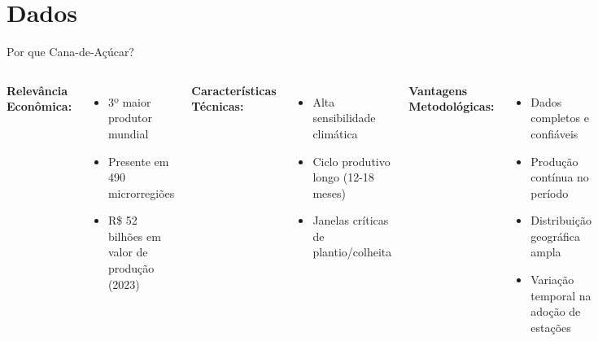 \documentclass[10pt,aspectratio=169]{beamer}
\begin{document}
\section{Dados}

\begin{frame}{Por que Cana-de-Açúcar?}
\begin{columns}
\textbf{Relevância Econômica:}
\begin{itemize}
    \item 3º maior produtor mundial
    \item Presente em 490 microrregiões
    \item R\$ 52 bilhões em valor de produção (2023)
\end{itemize}

\textbf{Características Técnicas:}
\begin{itemize}
    \item Alta sensibilidade climática
    \item Ciclo produtivo longo (12-18 meses)
    \item Janelas críticas de plantio/colheita
\end{itemize}

\textbf{Vantagens Metodológicas:}
\begin{itemize}
    \item Dados completos e confiáveis
    \item Produção contínua no período
    \item Distribuição geográfica ampla
    \item Variação temporal na adoção de estações
\end{itemize}

\begin{alertblock}{Implicação}
Cultura ideal para identificar impactos de informação meteorológica
\end{alertblock}
\end{columns}
\end{frame}
\end{document}

